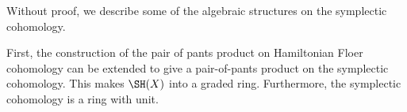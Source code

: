 
Without proof, we describe some of the algebraic structures on the symplectic cohomology. 

First, the construction of the pair of pants product on Hamiltonian Floer cohomology can be extended to give a pair-of-pants product on the symplectic cohomology. This makes $\SH(X)$ into a graded ring. Furthermore, the symplectic cohomology is a ring with unit.


